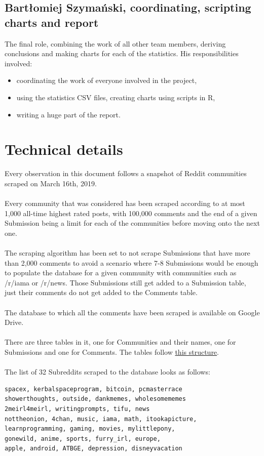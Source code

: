\documentclass{article}
\begin{document}
\subsection{Bartłomiej Szymański, coordinating, scripting charts and report}
The final role, combining the work of all other team members, deriving conclusions and making charts for each of the statistics. His responsibilities involved:
\begin{itemize}
	\item coordinating the work of everyone involved in the project,
	\item using the statistics CSV files, creating charts using scripts in R,
	\item writing a huge part of the report.
\end{itemize}

\section{Technical details}
Every observation in this document follows a snapshot of Reddit communities scraped on March 16th, 2019. \\ \\
Every community that was considered has been scraped according to at most 1,000 all-time highest rated posts, with 100,000 comments and the end of a given Submission being a limit for each of the communities before moving onto the next one. \\ \\
The scraping algorithm has been set to not scrape Submissions that have more than 2,000 comments to avoid a scenario where 7-8 Submissions would be enough to populate the database for a given community with communities such as /r/iama or /r/news. Those Submissions still get added to a Submission table, just their comments do not get added to the Comments table.\\ \\
The database to which all the comments have been scraped is available on Google Drive. \\ \\
There are three tables in it, one for Communities and their names, one for Submissions and one for Comments. The tables follow \href{https://github.com/scrapingredditboys/ScrapingRedditNaturalLanguageProcessingWUT2019/blob/master/reddit-collector/tables.sql}{this structure}.\\ \\
The list of 32 Subreddits scraped to the database looks as follows:
\begin{verbatim}
spacex, kerbalspaceprogram, bitcoin, pcmasterrace
showerthoughts, outside, dankmemes, wholesomememes
2meirl4meirl, writingprompts, tifu, news
nottheonion, 4chan, music, iama, math, itookapicture,
learnprogramming, gaming, movies, mylittlepony, 
gonewild, anime, sports, furry_irl, europe, 
apple, android, ATBGE, depression, disneyvacation
\end{verbatim}
\end{document}
